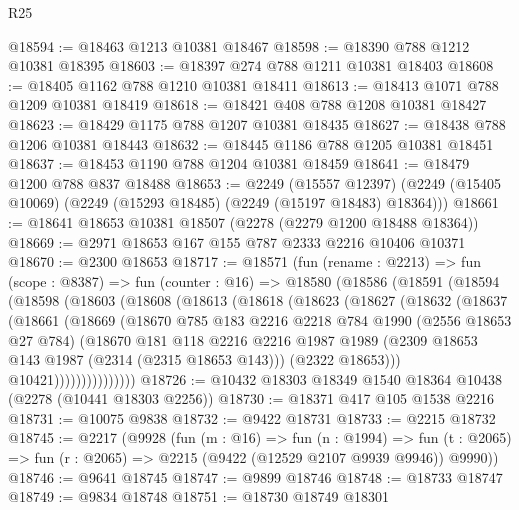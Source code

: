 \begin{lexlean}{R25}
\begin{coremodule}
@18594 := @18463 @1213 @10381 @18467
@18598 := @18390 @788 @1212 @10381 @18395
@18603 := @18397 @274 @788 @1211 @10381 @18403
@18608 := @18405 @1162 @788 @1210 @10381 @18411
@18613 := @18413 @1071 @788 @1209 @10381 @18419
@18618 := @18421 @408 @788 @1208 @10381 @18427
@18623 := @18429 @1175 @788 @1207 @10381 @18435
@18627 := @18438 @788 @1206 @10381 @18443
@18632 := @18445 @1186 @788 @1205 @10381 @18451
@18637 := @18453 @1190 @788 @1204 @10381 @18459
@18641 := @18479 @1200 @788 @837 @18488
@18653 := @2249
    (@15557 @12397)
    (@2249 (@15405 @10069) (@2249 (@15293 @18485) (@2249 (@15197 @18483) @18364)))
@18661 := @18641 @18653 @10381 @18507 (@2278 (@2279 @1200 @18488 @18364))
@18669 := @2971 @18653 @167 @155 @787 @2333 @2216 @10406 @10371
@18670 := @2300 @18653
@18717 := @18571
    (fun (rename : @2213) =>
    fun (scope : @8387) =>
    fun (counter : @16) =>
    @18580
      (@18586
        (@18591
          (@18594
            (@18598
              (@18603
                (@18608
                  (@18613
                    (@18618
                      (@18623
                        (@18627
                          (@18632
                            (@18637
                              (@18661
                                (@18669
                                  (@18670
                                    @785
                                    @183
                                    @2216
                                    @2218
                                    @784
                                    @1990
                                    (@2556 @18653 @27 @784)
                                    (@18670
                                      @181
                                      @118
                                      @2216
                                      @2216
                                      @1987
                                      @1989
                                      (@2309 @18653 @143 @1987 (@2314 (@2315 @18653 @143)))
                                      (@2322 @18653)))
                                  @10421)))))))))))))))
@18726 := @10432 @18303 @18349 @1540 @18364 @10438 (@2278 (@10441 @18303 @2256))
@18730 := @18371 @417 @105 @1538 @2216
@18731 := @10075 @9838
@18732 := @9422 @18731
@18733 := @2215 @18732
@18745 := @2217
    (@9928
      (fun (m : @16) =>
      fun (n : @1994) =>
      fun (t : @2065) => fun (r : @2065) => @2215 (@9422 (@12529 @2107 @9939 @9946)) @9990))
@18746 := @9641 @18745
@18747 := @9899 @18746
@18748 := @18733 @18747
@18749 := @9834 @18748
@18751 := @18730 @18749 @18301

\end{coremodule}
\end{lexlean}
